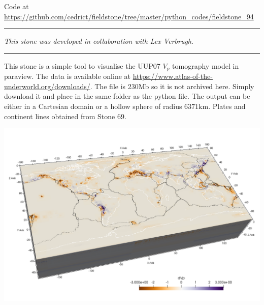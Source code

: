 

\begin{center}
Code at \url{https://github.com/cedrict/fieldstone/tree/master/python_codes/fieldstone_94}
\end{center}

\par\noindent\rule{\textwidth}{0.4pt}

{\sl This stone was developed in collaboration with Lex Verbrugh}. 

\par\noindent\rule{\textwidth}{0.4pt}


This stone is a simple tool to visualise the UUP07 $V_p$ tomography model \cite{hasp15} in paraview. 
The data is available online at \url{https://www.atlas-of-the-underworld.org/downloads/}.
The file is 230Mb so it is not archived here. 
Simply download it and place in the same folder as the python file. 
The output can be either in a Cartesian domain or a hollow sphere of radius $6371\si{\kilo\metre}$.
Plates and continent lines obtained from Stone 69.

\begin{center}
\includegraphics[width=14cm]{python_codes/fieldstone_94/map} 
\end{center}


